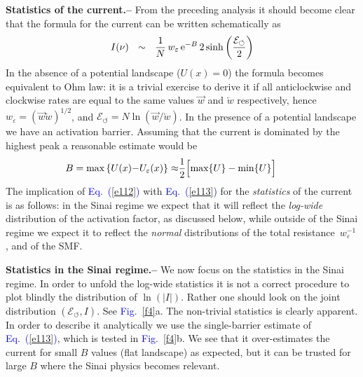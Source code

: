 \documentclass[aps,prl,floats,floatfix,twocolumn]{revtex4}
\newcommand{\eexp}{\mbox{e}^}
\newcommand{\mylabel}[1]{\label{#1}}
\newcommand{\eeq}{\end{eqnarray}}
\newcommand{\be}[1]{\begin{eqnarray}\ifthenelse{#1=-1}
{\nonumber}{\ifthenelse{#1=0}{}{\mylabel{e#1}}}}
\newcommand{\sect}[1]{{\bf #1.-- }}
\newcommand{\Eq}[1]{\textcolor{blue}{Eq.\!\!~(\ref{#1})}}
\newcommand{\Fig}[1]{\textcolor{blue}{Fig.}\!\!~\ref{#1}}
\begin{document}
\sect{Statistics of the current}
%
%
From the preceding analysis it should become clear that 
the formula for the current can be written schematically as 
%
\be{112}
I(\nu) \ \ \sim \ \  \frac{1}{N} \, w_{\varepsilon} \, \eexp{-B} \, 2\sinh\left(\frac{\mathcal{E}_{\circlearrowleft}}{2}\right)
\eeq
%
In the absence of a potential landscape ($U(x)=0$) the formula becomes equivalent to Ohm law: 
it is a trivial exercise to derive it if all anticlockwise and clockwise rates are equal 
to the same values $\overrightarrow{w}$ and $\overleftarrow{w}$ respectively, 
hence $w_{\varepsilon}=(\overrightarrow{w} \overleftarrow{w})^{1/2}$, 
and ${\mathcal{E}_{\circlearrowleft}=N\ln(\overrightarrow{w}/\overleftarrow{w})}$.   
In the presence of a potential landscape we have an activation barrier.
Assuming that the current is dominated by the highest peak 
a reasonable estimate would be
%
\be{113}
B = \text{max}\left\{ U(x){-}U_{\varepsilon}(x) \right\} 
\approx& \frac{1}{2} \Big[ \text{max}\{U\} - \text{min}\{U\} \Big] \ \ \ \ 
\eeq 
%
The implication of \Eq{e112} with \Eq{e113} for the {\em statistics} of the current 
is as follows: in the Sinai regime we expect that it will reflect 
the {\em log-wide} distribution of the activation factor, as discussed below, 
while outside of the Sinai regime we expect it to reflect the {\em normal} distributions 
of the total resistance~$w_{\varepsilon}^{-1}$, and of the SMF.  


\sect{Statistics in the Sinai regime}
%
We now focus on the statistics in the Sinai regime. 
In order to unfold the log-wide statistics it is 
not a correct procedure to plot blindly the distribution 
of $\ln(|I|)$. Rather one should look on the joint 
distribution ${(\mathcal{E}_{\circlearrowleft},I)}$. 
See \Fig{f4}a. The non-trivial statistics is clearly apparent.
In order to describe it analytically we use 
the single-barrier estimate of \Eq{e113}, 
which is tested in \Fig{f4}b. We see that it 
over-estimates the current for small $B$ values 
(flat landscape) as expected, but it can be trusted 
for large $B$ where the Sinai physics becomes relevant. 
\end{document}
